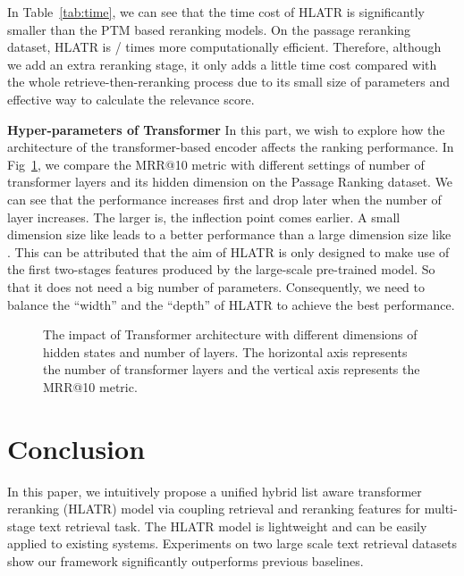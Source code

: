 \documentclass[11pt]{article}
\begin{document}
In Table~\ref{tab:time}, we can see that the time cost of HLATR is significantly smaller than the PTM based reranking models. On the passage reranking dataset, HLATR is / times more computationally efficient. Therefore, although we add an extra reranking stage, it only adds a little time cost compared with the whole retrieve-then-reranking process due to its small size of parameters and effective way to calculate the relevance score.

\noindent \textbf{Hyper-parameters of Transformer} In this part, we wish to explore how the architecture of the transformer-based encoder affects the ranking performance. In Fig~\ref{fig:analysis}, we compare the MRR@10 metric with different settings of number of transformer layers and its hidden dimension  on the Passage Ranking dataset. We can see that the performance increases first and drop later when the number of layer increases. The larger  is, the inflection point comes earlier. A small dimension size like  leads to a better performance than a large dimension size like . This can be attributed that the aim of HLATR is only designed to make use of the first two-stages features produced by the large-scale pre-trained model. So that it does not need a big number of parameters. Consequently, we need to balance the ``width'' and the ``depth'' of HLATR to achieve the best performance.

\begin{figure}[h]
    \centering
    \caption{The impact of Transformer architecture with different dimensions of hidden states  and number of layers. The horizontal axis represents the number of transformer layers and the vertical axis represents the MRR@10 metric.}
    \label{fig:analysis}
\end{figure}

\section{Conclusion}
In this paper, we intuitively propose a unified hybrid list aware transformer reranking (HLATR) model via coupling retrieval and reranking features for multi-stage text retrieval task. The HLATR model is lightweight and can be easily applied to existing systems. Experiments on two large scale text retrieval datasets show our framework significantly outperforms previous baselines. 


\end{document}
